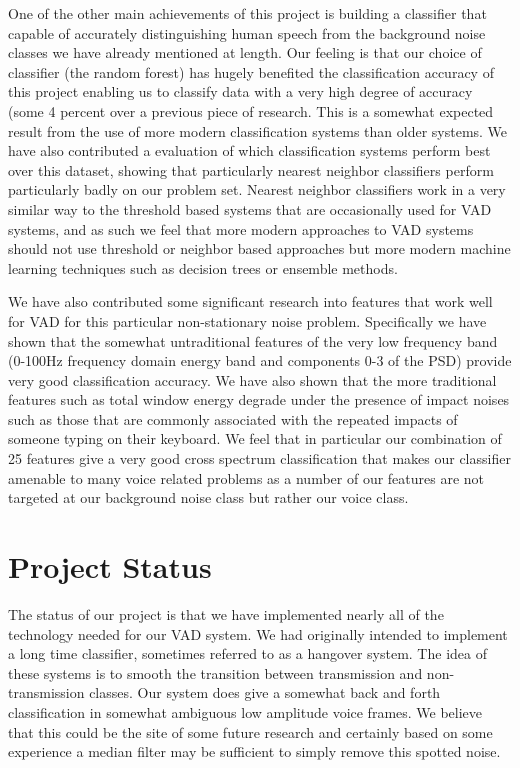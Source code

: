\documentclass[ %
                    author={Sam Phippen},
                supervisor={Dr. Rafal Bogacz},
                     title={Real time voice activity detectors in noisy personal computing environments},
                  subtitle={},
                    degree={MEng},
                      year={2012} ]{thesis}
\begin{document}
One of the other main achievements of this project is building a classifier
that capable of accurately distinguishing human speech from the background
noise classes we have already mentioned at length. Our feeling is that our
choice of classifier (the random forest) has hugely benefited the
classification accuracy of this project enabling us to classify data with a
very high degree of accuracy (some 4 percent over a previous piece of
research\cite{shin}. This is a somewhat expected result from the use of more
modern classification systems than older systems. We have also contributed a
evaluation of which classification systems perform best over this dataset,
showing that particularly nearest neighbor classifiers perform particularly
badly on our problem set. Nearest neighbor classifiers work in a very similar
way to the threshold based systems that are occasionally used for VAD systems,
and as such we feel that more modern approaches to VAD systems should not use
threshold or neighbor based approaches but more modern machine learning
techniques such as decision trees or ensemble methods.

We have also contributed some significant research into features that work well
for VAD for this particular non-stationary noise problem. Specifically we have
shown that the somewhat untraditional features of the very low frequency band
(0-100Hz frequency domain energy band and components 0-3 of the PSD) provide
very good classification accuracy. We have also shown that the more traditional
features such as total window energy degrade under the presence of impact
noises such as those that are commonly associated with the repeated impacts of
someone typing on their keyboard. We feel that in particular our combination of
25 features give a very good cross spectrum classification that makes our
classifier amenable to many voice related problems as a number of our features
are not targeted at our background noise class but rather our voice class.

\section{Project Status}

The status of our project is that we have implemented nearly all of the
technology needed for our VAD system. We had originally intended to implement a
long time classifier, sometimes referred to as a hangover system. The idea of
these systems is to smooth the transition between transmission and
non-transmission classes. Our system does give a somewhat back and forth
classification in somewhat ambiguous low amplitude voice frames. We believe
that this could be the site of some future research and certainly based on
some experience a median filter may be sufficient to simply remove this spotted
noise.
\end{document}
